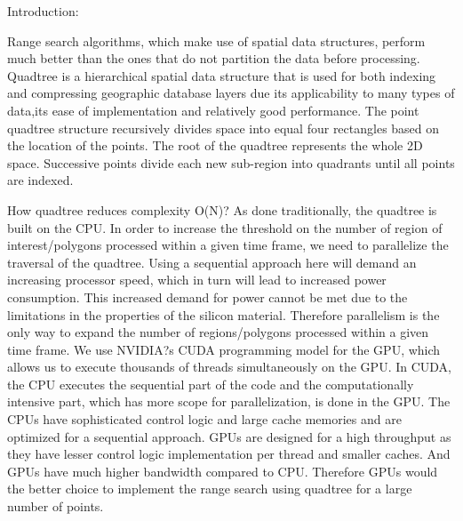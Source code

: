 Introduction:

Range search algorithms, which make use of spatial data structures, perform much better than the ones that do not partition the data before processing. Quadtree is a hierarchical spatial data structure that is used for both indexing and compressing geographic database layers due its applicability to many types of data,its ease of implementation and relatively good performance. The point quadtree structure recursively divides space into equal four rectangles based on the location of the points. The root of the quadtree represents the whole 2D space. Successive points divide each new sub-region into quadrants until all points are indexed.

How quadtree reduces complexity O(N)?
As done traditionally, the quadtree is built on the CPU. In order to increase the threshold on the number of region of interest/polygons processed within a given time frame, we need to parallelize the traversal of the quadtree. Using a sequential approach here will demand an increasing processor speed, which in turn will lead to increased power consumption. This increased demand for power cannot be met due to the limitations in the properties of the silicon material. Therefore parallelism is the only way to expand the number of regions/polygons processed within a given time frame. 
We use NVIDIA?s CUDA programming model for the GPU, which allows us to execute thousands of threads simultaneously on the GPU. In CUDA, the CPU executes the sequential part of the code and the computationally intensive part, which has more scope for parallelization, is done in the GPU. The CPUs have sophisticated control logic and large cache memories and are optimized for a sequential approach. GPUs are designed for a high throughput as they have lesser control logic implementation per thread and smaller caches. And GPUs have much higher bandwidth compared to CPU. Therefore GPUs would the better choice to implement the range search using quadtree for a large number of points.
